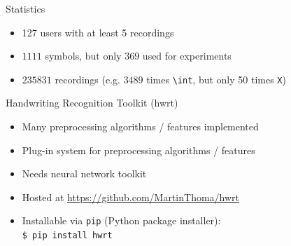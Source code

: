 

\begin{frame}[fragile]{Statistics}
    \begin{itemize}
        \item 127 users with at least 5 recordings
        \item $\num{1111}$ symbols, but only $\num{369}$ used for experiments
        \item $\num{235831}$ recordings (e.g. $\num{3489}$ times \verb+\int+, but only 50 times \verb+X+)
    \end{itemize}
\end{frame}


\begin{frame}[fragile]{Handwriting Recognition Toolkit (hwrt)}
    \begin{itemize}
        \item Many preprocessing algorithms / features implemented
        \item Plug-in system for preprocessing algorithms / features
        \item Needs neural network toolkit
        \item Hosted at \url{https://github.com/MartinThoma/hwrt}
        \item Installable via \verb+pip+ (Python package installer):\\
              \verb+$ pip install hwrt+
    \end{itemize}
\end{frame}

